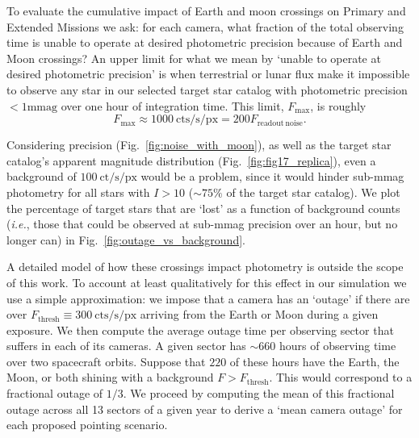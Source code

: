 To evaluate the cumulative impact of Earth and moon crossings on \tesss Primary and Extended Missions we ask: for each camera, what fraction of the total observing time is \tess unable to operate at desired photometric precision because of Earth and Moon crossings?
An upper limit for what we mean by `unable to operate at desired photometric precision' is when terrestrial or lunar flux make it impossible to observe any star in our selected target star catalog with photometric precision $<1 \text{mmag}$ over one hour of integration time.
This limit, $F_\text{max}$, is roughly
\begin{equation*}
 F_\mathrm{max} \approx 1000\mathrm{\ cts/s/px} = 200 F_\mathrm{readout\ noise}.
\end{equation*}

Considering \tesss precision (Fig.~\ref{fig:noise_with_moon}), as well as the target star catalog's apparent magnitude distribution (Fig.~\ref{fig:fig17_replica}), even a background of $100\ \text{ct/s/px}$ would be a problem, since it would hinder sub-mmag photometry for all stars with $I > 10$ ($\sim75\%$ of the target star catalog). We plot the percentage of target stars that are `lost' as a function of background counts (\textit{i.e.}, those that could be observed at sub-mmag precision over an hour, but no longer can) in Fig.~\ref{fig:outage_vs_background}.

A detailed model of how these crossings impact \tess photometry is outside the scope of this work.
To account at least qualitatively for this effect in our simulation we use a simple approximation: we impose that a camera has an `outage' if there are over $F_\text{thresh}\equiv300\ \text{cts/s/px}$ arriving from the Earth or Moon during a given exposure.
We then compute the average outage time per observing sector that \tess suffers in each of its cameras. 
A given sector has $\sim660$ hours of observing time over two spacecraft orbits.
Suppose that $220$ of these hours have the Earth, the Moon, or both shining with a background $F > F_\text{thresh}$. 
This would correspond to a fractional outage of $1/3$. 
We proceed by computing the mean of this fractional outage across all 13 sectors of a given year to derive a `mean camera outage' for each proposed pointing scenario.


